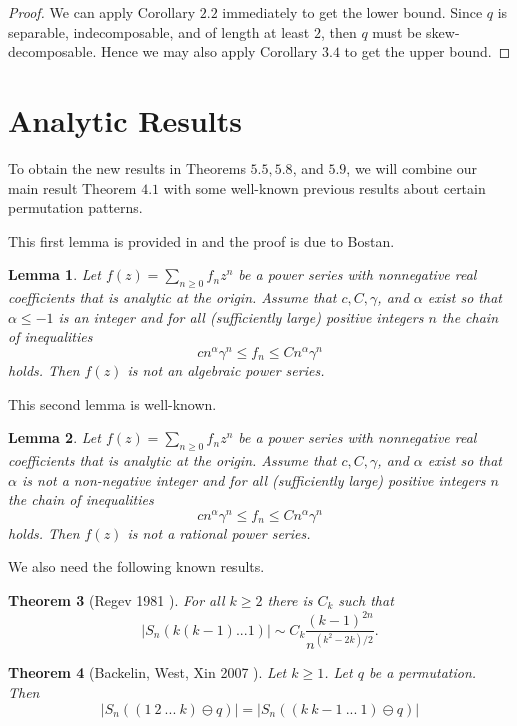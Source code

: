 \documentclass[11pt, final]{amsart}
\newtheorem{theorem}{Theorem}[section]								\newtheorem{proposition}[theorem]{Proposition}
\newtheorem{lemma}[theorem]{Lemma}
\theoremstyle{remark}
\numberwithin{equation}{section}
\begin{document}
\begin{proof}
    We can apply Corollary $2.2$ immediately to get the lower bound. Since $q$ is separable, indecomposable, and of length at least $2$, then $q$ must be skew-decomposable. Hence we may also apply Corollary $3.4$ to get the upper bound.
\end{proof}


\section{Analytic Results}
To obtain the new results in Theorems $5.5, 5.8$, and $5.9$, we will combine our main result Theorem $4.1$ with some well-known previous results about certain permutation patterns.

This first lemma is provided in \cite{Bona} and the proof is due to Bostan.
\begin{lemma}
    Let $f(z) = \sum_{n\geq 0} f_n z^n$ be a power series with nonnegative real coefficients that is analytic at the origin. Assume that $c,C,\gamma$, and $\alpha$ exist so that $\alpha \leq -1$ is an integer and for all (sufficiently large) positive integers $n$ the chain of inequalities
    \[
    cn^\alpha \gamma^n \leq f_n \leq Cn^\alpha \gamma^n
    \]
    holds. Then $f(z)$ is not an algebraic power series.
\end{lemma}

\vspace{10pt}
This second lemma is well-known.
\begin{lemma}
    Let $f(z) = \sum_{n\geq 0} f_n z^n$ be a power series with nonnegative real coefficients that is analytic at the origin. Assume that $c,C,\gamma$, and $\alpha$ exist so that $\alpha$ is not a non-negative integer and for all (sufficiently large) positive integers $n$ the chain of inequalities
    \[
    cn^\alpha \gamma^n \leq f_n \leq Cn^\alpha \gamma^n
    \]
    holds. Then $f(z)$ is not a rational power series.
\end{lemma}

We also need the following known results.

\begin{theorem}[Regev 1981 \cite{Regev}]
    For all $k\geq 2$ there is $C_k$ such that
    \[
    |S_n(k(k-1)...1)| \sim C_k \frac{(k-1)^{2n}}{n^{(k^2-2k)/2}}.
    \]
\end{theorem}

\begin{theorem}[Backelin, West, Xin 2007 \cite{BackelinWestXin}]
Let $k \geq 1$. Let $q$ be a permutation. Then
\[
|S_n((1 \ 2 \ ... \ k) \ominus q)| = |S_n((k  \ k-1 \ ...  \ 1 )
\ominus q)|
\]
\end{theorem}
\end{document}
